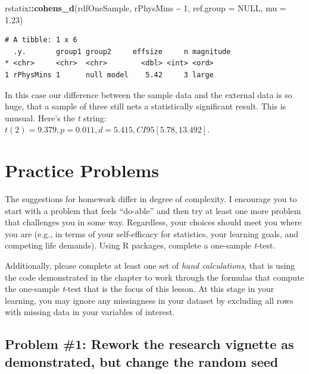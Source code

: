 \documentclass[
  11pt,
]{book}
\newenvironment{Shaded}{\begin{snugshade}}{\end{snugshade}}
\newcommand{\AttributeTok}[1]{\textcolor[rgb]{0.27,0.27,0.27}{#1}}
\newcommand{\ConstantTok}[1]{\textcolor[rgb]{0.37,0.37,0.37}{#1}}
\newcommand{\DecValTok}[1]{\textcolor[rgb]{0.06,0.06,0.06}{#1}}
\newcommand{\FloatTok}[1]{\textcolor[rgb]{0.06,0.06,0.06}{#1}}
\newcommand{\FunctionTok}[1]{\textcolor[rgb]{0.27,0.27,0.27}{\textbf{#1}}}
\newcommand{\NormalTok}[1]{#1}
\newcommand{\SpecialCharTok}[1]{\textcolor[rgb]{0.43,0.43,0.43}{\textbf{#1}}}
\begin{document}
\begin{Shaded}
\begin{Highlighting}[]
\NormalTok{rstatix}\SpecialCharTok{::}\FunctionTok{cohens\_d}\NormalTok{(rdfOneSample, rPhysMins }\SpecialCharTok{\textasciitilde{}} \DecValTok{1}\NormalTok{, }\AttributeTok{ref.group =} \ConstantTok{NULL}\NormalTok{, }\AttributeTok{mu =} \FloatTok{1.23}\NormalTok{)}
\end{Highlighting}
\end{Shaded}

\begin{verbatim}
# A tibble: 1 x 6
  .y.       group1 group2     effsize     n magnitude
* <chr>     <chr>  <chr>        <dbl> <int> <ord>    
1 rPhysMins 1      null model    5.42     3 large    
\end{verbatim}

In this case our difference between the sample data and the external data is so huge, that a sample of three still nets a statistically significant result. This is unusual. Here's the \emph{t} string: \(t(2) = 9.379, p = 0.011, d = 5.415, CI95[5.78, 13.492]\).

\hypertarget{practice-problems-2}{%
\section{Practice Problems}\label{practice-problems-2}}

The suggestions for homework differ in degree of complexity. I encourage you to start with a problem that feels ``do-able'' and then try at least one more problem that challenges you in some way. Regardless, your choices should meet you where you are (e.g., in terms of your self-efficacy for statistics, your learning goals, and competing life demands). Using R packages, complete a one-sample \emph{t}-test.

Additionally, please complete at least one set of \emph{hand calculations}, that is using the code demonstrated in the chapter to work through the formulas that compute the one-sample \emph{t}-test that is the focus of this lesson. At this stage in your learning, you may ignore any missingness in your dataset by excluding all rows with missing data in your variables of interest.

\hypertarget{problem-1-rework-the-research-vignette-as-demonstrated-but-change-the-random-seed}{%
\subsection{Problem \#1: Rework the research vignette as demonstrated, but change the random seed}\label{problem-1-rework-the-research-vignette-as-demonstrated-but-change-the-random-seed}}
\end{document}
